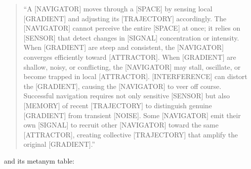 \begin{quote}
``A {[}NAVIGATOR{]} moves through a {[}SPACE{]} by sensing local {[}GRADIENT{]} and adjusting its {[}TRAJECTORY{]} accordingly. The {[}NAVIGATOR{]} cannot perceive the entire {[}SPACE{]} at once; it relies on {[}SENSOR{]} that detect changes in {[}SIGNAL{]} concentration or intensity. When {[}GRADIENT{]} are steep and consistent, the {[}NAVIGATOR{]} converges efficiently toward {[}ATTRACTOR{]}. When {[}GRADIENT{]} are shallow, noisy, or conflicting, the {[}NAVIGATOR{]} may stall, oscillate, or become trapped in local {[}ATTRACTOR{]}. {[}INTERFERENCE{]} can distort the {[}GRADIENT{]}, causing the {[}NAVIGATOR{]} to veer off course. Successful navigation requires not only sensitive {[}SENSOR{]} but also {[}MEMORY{]} of recent {[}TRAJECTORY{]} to distinguish genuine {[}GRADIENT{]} from transient {[}NOISE{]}. Some {[}NAVIGATOR{]} emit their own {[}SIGNAL{]} to recruit other {[}NAVIGATOR{]} toward the same {[}ATTRACTOR{]}, creating collective {[}TRAJECTORY{]} that amplify the original {[}GRADIENT{]}.''
\end{quote}

and its metanym table:

\protect{}\label{tab-anchor-metanym}{}

